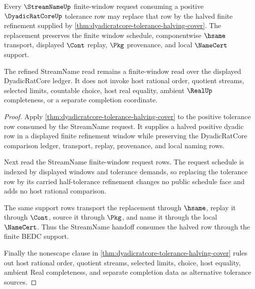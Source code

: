 \begin{theorem}
\label{thm:dyadicratcore-halving-cover-streamname-handoff}
Every $\StreamNameUp$ finite-window request consuming a positive
$\DyadicRatCoreUp$ tolerance row may replace that row by the halved finite
refinement supplied by \autoref{thm:dyadicratcore-tolerance-halving-cover}.
The replacement preserves the finite window schedule, componentwise $\hsame$
transport, displayed $\Cont$ replay, $\Pkg$ provenance, and local $\NameCert$
support.

The refined StreamName read remains a finite-window read over the displayed
DyadicRatCore ledger. It does not invoke host rational order, quotient streams,
selected limits, countable choice, host real equality, ambient
$\RealUp$ completeness, or a separate completion coordinate.
\end{theorem}
\begin{proof}
Apply \autoref{thm:dyadicratcore-tolerance-halving-cover} to the positive
tolerance row consumed by the StreamName request. It supplies a halved positive
dyadic row in a displayed finite refinement window while preserving the
DyadicRatCore comparison ledger, transport, replay, provenance, and local
naming rows.

Next read the StreamName finite-window request rows. The request schedule is
indexed by displayed windows and tolerance demands, so replacing the tolerance
row by its carried half-tolerance refinement changes no public schedule face
and adds no host rational comparison.

The same support rows transport the replacement through $\hsame$, replay it
through $\Cont$, source it through $\Pkg$, and name it through the local
$\NameCert$. Thus the StreamName handoff consumes the halved row through the
finite BEDC support.

Finally the nonescape clause in
\autoref{thm:dyadicratcore-tolerance-halving-cover} rules out host rational
order, quotient streams, selected limits, choice, host equality, ambient Real
completeness, and separate completion data as alternative tolerance sources.
\end{proof}

